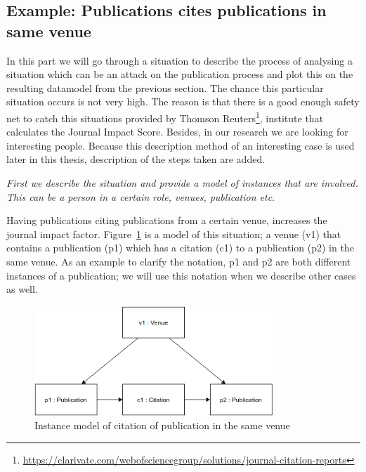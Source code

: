 \documentclass{ou-report}
\begin{document}
\subsection{Example: Publications cites publications in same venue}
\label{interesting_case:publications_cites_publications_in_same_venue}
In this part we will go through a situation to describe the process of analysing
a situation which can be an attack on the publication process and plot this on the
resulting datamodel from the previous section. The chance this 
particular situation occurs is not very high. The reason is that there is a good
enough safety net to catch this situations provided by Thomson Reuters\footnote{\url{https://clarivate.com/webofsciencegroup/solutions/journal-citation-reports}}, 
institute that 
calculates the Journal Impact Score. Besides, in our research we are looking for
interesting people. Because this description method of an interesting case is
used later in this thesis, description of the steps taken are added. 

\textit{First we describe the situation and provide a model of instances that 
are involved. This can be a person in a certain role, venues, publication etc}.

Having publications citing publications from a certain venue, increases the 
journal impact factor.
Figure~\ref{fig:cpsv} is a model of this situation; a venue (v1) that
contains a publication (p1) which has a citation (c1) to a publication (p2) in
the same venue. As an example to clarify the notation, p1 and p2 are both 
different instances of a publication; we will use this notation when we describe 
other cases as well.

\begin{figure}[ht]
\centering
\includegraphics[width=9cm]{images/cited_publications_same_journal.drawio.png}
\caption{Instance model of citation of publication in the same venue}
\label{fig:cpsv}
\end{figure}

\end{document}

